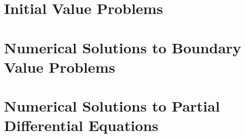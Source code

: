 \documentclass[
  oneside,
  11pt, a4paper,
  footinclude=true,
  headinclude=true,
  cleardoublepage=empty
]{scrbook}
\begin{document}


%

%

\part{Initial Value Problems}







\part{Numerical Solutions to Boundary Value Problems}

\part{Numerical Solutions to Partial Differential Equations}











\printindex
\end{document}
